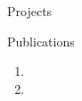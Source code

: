 \documentclass{resume}
\begin{document}
\begin{rSection}{Projects}




	\end{rSection}
	\vspace{-5pt}

	\begin{rSection}{Publications}
		\begin{enumerate}
			\setlength{\itemsep}{1pt}
            \setlength{\parskip}{0pt}
			\setlength{\parsep}{0pt}
			\item {}
			\item {}
		\end{enumerate}
	\end{rSection}
	
	\vspace{-5pt}
\end{document}
